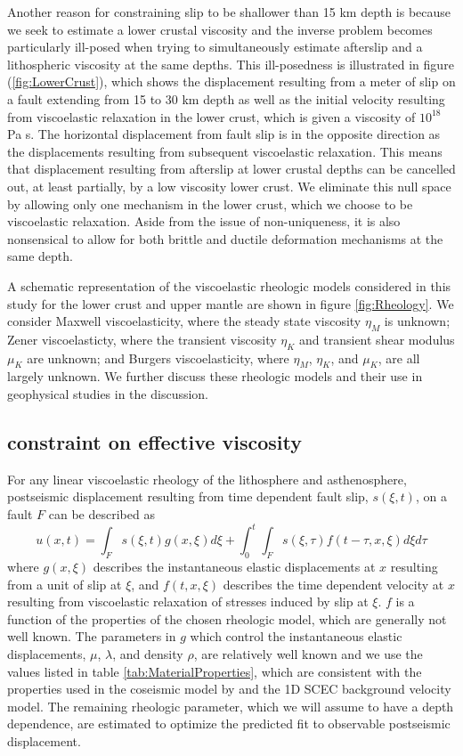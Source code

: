 \documentclass[1p]{elsarticle}
\begin{document}
Another reason for constraining slip to be shallower than 15 km depth is because we seek to estimate a lower crustal viscosity and the inverse problem becomes particularly ill-posed when trying to simultaneously estimate afterslip and a lithospheric viscosity at the same depths. 
This ill-posedness is illustrated in figure (\ref{fig:LowerCrust}), which shows the displacement resulting from a meter of slip on a fault extending from 15 to 30 km depth as well as the initial velocity resulting from viscoelastic relaxation in the lower crust, which is given a viscosity of $10^{18}$ Pa s.  The horizontal displacement from fault slip is in the opposite direction as the displacements resulting from subsequent viscoelastic relaxation.  This means that displacement resulting from afterslip at lower crustal depths can be cancelled out, at least partially, by a low viscosity lower crust.  We eliminate this null space by allowing only one mechanism in the lower crust, which we choose to be viscoelastic relaxation.  Aside from the issue of non-uniqueness, it is also nonsensical to allow for both brittle and ductile deformation mechanisms at the same depth. 

A schematic representation of the viscoelastic rheologic models considered in this study for the lower crust and upper mantle are shown in figure \ref{fig:Rheology}.  We consider Maxwell viscoelasticity, where the steady state viscosity $\eta_M$ is unknown; Zener viscoelasticty, where the transient viscosity $\eta_K$ and transient shear modulus $\mu_K$ are unknown; and Burgers viscoelasticity, where $\eta_M$, $\eta_K$, and $\mu_K$, are all largely unknown. We further discuss these rheologic models and their use in geophysical studies in the discussion. 

\subsection{constraint on effective viscosity}\label{sec:InitialInversion}
For any linear viscoelastic rheology of the lithosphere and asthenosphere, postseismic displacement resulting from time dependent fault slip, $s(\xi,t)$, on a fault $F$ can be described as  
\begin{equation}\label{GeneralForward}
  u(x,t) = \int_F s(\xi,t)g(x,\xi)d\xi + 
           \int_0^t\int_F s(\xi,\tau) f(t-\tau,x,\xi) d\xi d\tau
\end{equation}
where $g(x,\xi)$ describes the instantaneous elastic displacements at $x$ resulting from a unit of slip at $\xi$, and $f(t,x,\xi)$ describes the time dependent velocity at $x$ resulting from viscoelastic relaxation of stresses induced by slip at $\xi$. $f$ is a function of the properties of the chosen rheologic model, which are generally not well known.  The parameters in $g$ which control the instantaneous elastic displacements, $\mu$, $\lambda$, and density $\rho$, are relatively well known and we use the values listed in table \ref{tab:MaterialProperties}, which are consistent with the properties used in the coseismic model by \cite{Wei2011} and the 1D SCEC background velocity model.  The remaining rheologic parameter, which we will assume to have a depth dependence, are estimated to optimize the predicted fit to observable postseismic displacement.
\end{document}
